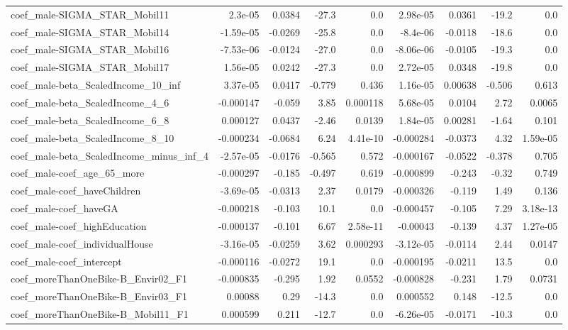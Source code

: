 \begin{tabular}{lrrrrrrrr}
coef_male-SIGMA_STAR_Mobil11 & 2.3e-05 & 0.0384 & -27.3 & 0.0 & 2.98e-05 & 0.0361 & -19.2 & 0.0 \\
coef_male-SIGMA_STAR_Mobil14 & -1.59e-05 & -0.0269 & -25.8 & 0.0 & -8.4e-06 & -0.0118 & -18.6 & 0.0 \\
coef_male-SIGMA_STAR_Mobil16 & -7.53e-06 & -0.0124 & -27.0 & 0.0 & -8.06e-06 & -0.0105 & -19.3 & 0.0 \\
coef_male-SIGMA_STAR_Mobil17 & 1.56e-05 & 0.0242 & -27.3 & 0.0 & 2.72e-05 & 0.0348 & -19.8 & 0.0 \\
coef_male-beta_ScaledIncome_10_inf & 3.37e-05 & 0.0417 & -0.779 & 0.436 & 1.16e-05 & 0.00638 & -0.506 & 0.613 \\
coef_male-beta_ScaledIncome_4_6 & -0.000147 & -0.059 & 3.85 & 0.000118 & 5.68e-05 & 0.0104 & 2.72 & 0.0065 \\
coef_male-beta_ScaledIncome_6_8 & 0.000127 & 0.0437 & -2.46 & 0.0139 & 1.84e-05 & 0.00281 & -1.64 & 0.101 \\
coef_male-beta_ScaledIncome_8_10 & -0.000234 & -0.0684 & 6.24 & 4.41e-10 & -0.000284 & -0.0373 & 4.32 & 1.59e-05 \\
coef_male-beta_ScaledIncome_minus_inf_4 & -2.57e-05 & -0.0176 & -0.565 & 0.572 & -0.000167 & -0.0522 & -0.378 & 0.705 \\
coef_male-coef_age_65_more & -0.000297 & -0.185 & -0.497 & 0.619 & -0.000899 & -0.243 & -0.32 & 0.749 \\
coef_male-coef_haveChildren & -3.69e-05 & -0.0313 & 2.37 & 0.0179 & -0.000326 & -0.119 & 1.49 & 0.136 \\
coef_male-coef_haveGA & -0.000218 & -0.103 & 10.1 & 0.0 & -0.000457 & -0.105 & 7.29 & 3.18e-13 \\
coef_male-coef_highEducation & -0.000137 & -0.101 & 6.67 & 2.58e-11 & -0.00043 & -0.139 & 4.37 & 1.27e-05 \\
coef_male-coef_individualHouse & -3.16e-05 & -0.0259 & 3.62 & 0.000293 & -3.12e-05 & -0.0114 & 2.44 & 0.0147 \\
coef_male-coef_intercept & -0.000116 & -0.0272 & 19.1 & 0.0 & -0.000195 & -0.0211 & 13.5 & 0.0 \\
coef_moreThanOneBike-B_Envir02_F1 & -0.000835 & -0.295 & 1.92 & 0.0552 & -0.000828 & -0.231 & 1.79 & 0.0731 \\
coef_moreThanOneBike-B_Envir03_F1 & 0.00088 & 0.29 & -14.3 & 0.0 & 0.000552 & 0.148 & -12.5 & 0.0 \\
coef_moreThanOneBike-B_Mobil11_F1 & 0.000599 & 0.211 & -12.7 & 0.0 & -6.26e-05 & -0.0171 & -10.3 & 0.0 \\

\end{tabular}
